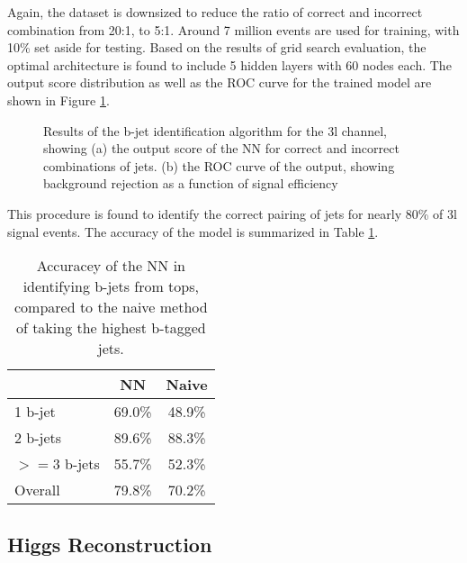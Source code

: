 Again, the dataset is downsized to reduce the ratio of correct and incorrect combination from 20:1, to 5:1. Around 7 million events are used for training, with 10\% set aside for testing. Based on the results of grid search evaluation, the optimal architecture is found to include 5 hidden layers with 60 nodes each. The output score distribution as well as the ROC curve for the trained model are shown in Figure \ref{fig:top3lresults}.

\begin{figure}[H]                                                                                                           
    \centering
   \label{fig:top3lresults}                                                                                               
   \caption{Results of the b-jet identification algorithm for the 3l channel, showing (a) the output score of the NN for correct and incorrect combinations of jets. (b) the ROC curve of the output, showing background rejection as a function of signal efficiency}
\end{figure}

This procedure is found to identify the correct pairing of jets for nearly 80\% of 3l signal events. The accuracy of the model is summarized in Table \ref{tab:topMatchAcc3l}.

\begin{table}[H]
\centering
\caption{Accuracey of the NN in identifying b-jets from tops, compared to the naive method of taking the highest b-tagged jets.}
\begin{tabular}{l|c|c}
\hline\hline
& NN & Naive \\
\hline
1 b-jet    & 69.0\% & 48.9\% \\
2 b-jets   & 89.6\% & 88.3\% \\
$>=$3 b-jets & 55.7\% & 52.3\% \\
\hline
Overall & 79.8\% & 70.2\% \\
\hline\hline
\end{tabular}
\label{tab:topMatchAcc3l}
\end{table}


\subsection{Higgs Reconstruction}
\label{sec:higgsID}

